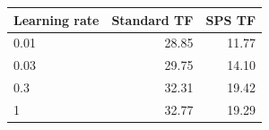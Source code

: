 \begin{tabular}{lrr}
\toprule
Learning rate & Standard TF & SPS TF \\
\midrule
0.01 & 28.85 & 11.77 \\
0.03 & 29.75 & 14.10 \\
0.3 & 32.31 & 19.42 \\
1 & 32.77 & 19.29 \\
\bottomrule
\end{tabular}
